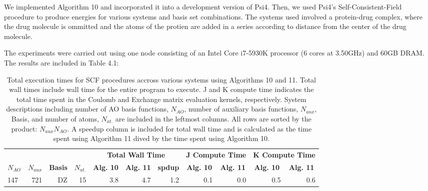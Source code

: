 We implemented Algorithm 10 and incorporated it into a development version of Psi4. Then, we used Psi4's Self-Consistent-Field
procedure to produce energies for various systems and basis set combinations. The systems used involved a protein-drug complex,
where the drug molecule is ommitted and the atoms of the protien are added in a series according to distance from the center of
the drug molecule. 

The experiments were carried out using one node consisting of an Intel Core i7-5930K processor
(6 cores at 3.50GHz) and 60GB DRAM. The results are included in Table 4.1:

\begingroup
\renewcommand{\arraystretch}{0.7}
\begin{table}[H]
\footnotesize
\centering
\renewcommand{\baselinestretch}{1}
\caption{Total execution times for SCF procedures accross various systems using Algorithms 10 and 11. Total wall times include 
wall time for the entire program to execute. J and K compute time indicates the total time spent in the Coulomb and Exchange matrix
evaluation kernels, respectively. System descriptions including number of AO basis functions, $N_{AO}$, number of auxiliary basis functions,
$N_{aux}$, Basis, and number of atoms, $N_{at.}$ are included in the leftmost columns.  All rows are sorted by the product: $N_{aux}N_{AO}$.
A speedup column is included for total wall time and is calculated as the time spent using Algorithm 11 dived by the time spent using
Algorithm 10.
\label{tbl:practical_speedups}}
\begin{tabular}{lrrrrrrrrrr}
  \multicolumn{1}{c}{\textbf{}} 
& \multicolumn{1}{c}{\textbf{}} 
& \multicolumn{1}{c}{\textbf{}} 
& \multicolumn{1}{c}{\textbf{}} 
& \multicolumn{3}{c}{\textbf{Total Wall Time}}  
& \multicolumn{2}{c}{\textbf{J Compute Time}}  
& \multicolumn{2}{c}{\textbf{K Compute Time}} \\ 
\cline{5-7}
\cline{8-9}
\cline{10-11}
  \multicolumn{1}{c}{\textbf{$N_{AO}$}} 
& \multicolumn{1}{c}{\textbf{$N_{aux}$}} 
& \multicolumn{1}{c}{\textbf{Basis}} 
& \multicolumn{1}{c}{\textbf{$N_{at.}$}} 
& \multicolumn{1}{c}{\textbf{Alg. 10}} 
& \multicolumn{1}{c}{\textbf{Alg. 11}} 
& \multicolumn{1}{c}{\textbf{spdup}} 
& \multicolumn{1}{c}{\textbf{Alg. 10}} 
& \multicolumn{1}{c}{\textbf{Alg. 11}} 
& \multicolumn{1}{c}{\textbf{Alg. 10}} 
& \multicolumn{1}{c}{\textbf{Alg. 11}} \\ 
\hline
147 &  721  &  DZ  &  15 &                  3.8 &                4.7 &  1.2   &               0.1 &               0.0 &                0.5 &                0.6\\ 

\end{tabular}
\end{table}
